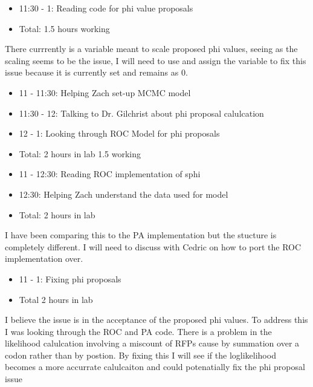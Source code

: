 \documentclass[12pt,hyperref]{labbook}
\begin{document}
\begin{itemize}
    \item 11:30 - 1: Reading code for phi value proposals
    \item Total: 1.5 hours working
\end{itemize}
There currrently is a variable meant to scale proposed phi values, seeing as the scaling seems to be the issue,
I will need to use and assign the variable to fix this issue because it is currently set and remains as 0.
\begin{itemize}
    \item 11 - 11:30: Helping Zach set-up MCMC model
    \item 11:30 - 12: Talking to Dr. Gilchrist about phi proposal calulcation
    \item 12 - 1: Looking through ROC Model for phi proposals
    \item Total: 2 hours in lab 1.5 working
\end{itemize}
\begin{itemize}
    \item 11 - 12:30: Reading ROC implementation of sphi
    \item 12:30: Helping Zach understand the data used for model
    \item Total: 2 hours in lab
\end{itemize}
I have been comparing this to the PA implementation but the stucture is completely different.
I will need to discuss with Cedric on how to port the ROC implementation over.
\begin{itemize}
    \item 11 - 1: Fixing phi proposals
    \item Total 2 hours in lab
\end{itemize}
I believe the issue is in the acceptance of the proposed phi values.
To address this I was looking through the ROC and PA code. There is a
problem in the likelihood calulcation involving a miscount of RFPs cause by summation over a codon rather than by postion. By fixing this I will see if the loglikelihood becomes a more accurrate calulcaiton and could potenatially fix the phi proposal issue
\end{document}
